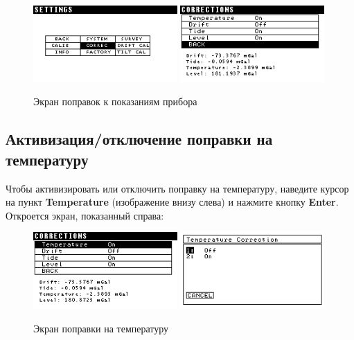 \begin{figure}[H]
  \centering
  \includegraphics[width=0.49\textwidth]{figures/the_instrument_corrections_screen_1}
  \includegraphics[width=0.49\textwidth]{figures/the_instrument_corrections_screen_2}
  \caption{Экран поправок к показаниям прибора}
  \label{fig:the_instrument_corrections_screen}
\end{figure}

\subsection{Активизация/отключение поправки на температуру}

Чтобы активизировать или отключить поправку на температуру, наведите курсор на
пункт \textbf{Temperature} (изображение внизу слева) и нажмите кнопку
\textbf{Enter}. Откроется экран, показанный справа:

\begin{figure}[H]
  \centering
  \includegraphics[width=0.49\textwidth]{figures/the_temperature_correction_screen_1}
  \includegraphics[width=0.49\textwidth]{figures/the_temperature_correction_screen_2}
  \caption{Экран поправки на температуру}
  \label{fig:the_temperature_correction_screen}
\end{figure}

